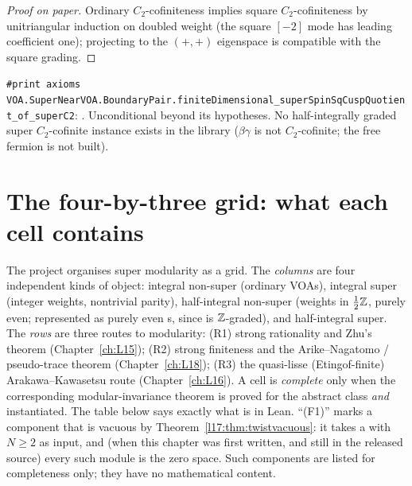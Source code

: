 \begin{proof}[Proof on paper]
Ordinary $C_2$-cofiniteness implies square $C_2$-cofiniteness by unitriangular induction on doubled
weight (the square $[-2]$ mode has leading coefficient one); projecting to the $(+,+)$ eigenspace is
compatible with the square grading.
\end{proof}
\begin{status}
\texttt{\#print axioms
VOA.SuperNearVOA.\allowbreak BoundaryPair.\allowbreak finiteDimensional\_\allowbreak superSpinSqCuspQuotient\_\allowbreak of\_superC2}:
. Unconditional beyond its hypotheses. No half-integrally
graded super $C_2$-cofinite instance exists in the library ($\beta\gamma$ is not $C_2$-cofinite; the free
fermion is not built).
\end{status}

\section{The four-by-three grid: what each cell contains}\label{l17:sec:grid}

The project organises super modularity as a grid. The \emph{columns} are four independent kinds of
object: integral non-super (ordinary VOAs), integral super (integer weights, nontrivial parity),
half-integral non-super (weights in $\frac12{\mathbb{Z}}$, purely even; represented as purely even
s, since  is ${\mathbb{Z}}$-graded), and
half-integral super. The \emph{rows} are three routes to modularity: (R1) strong rationality and Zhu's
theorem (Chapter~\ref{ch:L15}); (R2) strong finiteness and the Arike--Nagatomo / pseudo-trace theorem
(Chapter~\ref{ch:L18}); (R3) the quasi-lisse (Etingof-finite) Arakawa--Kawasetsu route
(Chapter~\ref{ch:L16}). A cell is \emph{complete} only when the corresponding modular-invariance
theorem is proved for the abstract class \emph{and} instantiated. The table below says exactly what is
in Lean. ``(F1)'' marks a component that is vacuous by Theorem~\ref{l17:thm:twistvacuous}: it takes
a  with $N\ge2$ as input, and (when this chapter was first written, and still in the released source) every such module is
the zero space. Such components are listed
for completeness only; they have no mathematical content.

